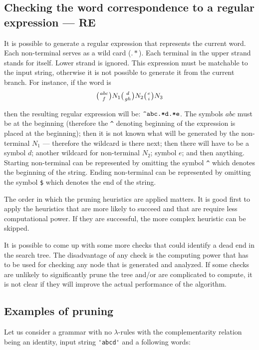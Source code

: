 \subsection{Checking the word correspondence to a regular expression --- RE}
It is possible to generate a regular expression that represents the current word. Each non-terminal serves as a wild card ($.*$). Each terminal in the upper strand stands for itself. Lower strand is ignored. This expression must be matchable to the input string, otherwise it is not possible to generate it from the current branch. For instance, if the word is
$$\wkpair{abc}{f}N_1\wkpair{d}{gh}N_2\wkpair{e}{i}N_3$$

then the resulting regular expression will be: $\verb/^abc.*d.*e/$. The symbols $abc$ must be at the beginning (therefore the \verb/^/ denoting beginning of the expression is placed at the beginning); then it is not known what will be generated by the non-terminal $N_1$ --- therefore the wildcard is there next; then there will have to be a symbol $d$; another wildcard for non-terminal $N_2$; symbol $e$; and then anything. Starting non-terminal can be represented by omitting the symbol \verb/^/ which denotes the beginning of the string. Ending non-terminal can be represented by omitting the symbol \verb/$/ which denotes the end of the string.

\medskip

The order in which the pruning heuristics are applied matters. It is good first to apply the heuristics that are more likely to succeed and that are require less computational power. If they are successful, the more complex heuristic can be skipped.

It is possible to come up with some more checks that could identify a dead end in the search tree. The disadvantage of any check is the computing power that has to be used for checking any node that is generated and analyzed. If some checks are unlikely to significantly prune the tree and/or are complicated to compute, it is not clear if they will improve the actual performance of the algorithm.

\subsection{Examples of pruning}
Let us consider a grammar with no $\lambda$-rules with the complementarity relation being an identity, input string \verb/'abcd'/  and a following words:

